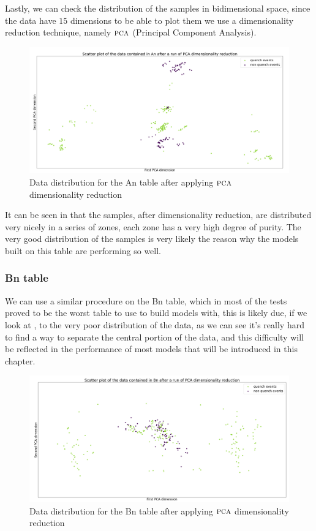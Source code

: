 Lastly, we can check the distribution of the samples in bidimensional space, since the data have
$15$ dimensions to be able to plot them we use a dimensionality reduction technique, namely
$\textsc{pca}$ (Principal Component Analysis).
\begin{figure}[h!]
	\centering
	\includegraphics[scale=.2]{img/An_distribution.png}
	\caption{Data distribution for the An table after applying $\textsc{pca}$ dimensionality
		reduction} \label{fig:an-dist}
\end{figure}

It can be seen in  that the samples, after dimensionality reduction, are distributed very nicely in a series
of zones, each zone has a very high degree of purity. The very good distribution of the samples is
very likely the reason why the models built on this table are performing so well.

\subsubsection{Bn table}
We can use a similar procedure on the Bn table, which in most of the tests proved to be the worst
table to use to build models with, this is likely due, if we look at , to the very
poor distribution of the data, as we can see it's really hard to find a way to separate the central
portion of the data, and this difficulty will be reflected in the performance of most models that
will be introduced in this chapter.
\begin{figure}[h!]
	\centering
	\includegraphics[scale=.2]{img/Bn_distribution.png}
	\caption{Data distribution for the Bn table after applying $\textsc{pca}$ dimensionality
		reduction} \label{fig:bn-dist}
\end{figure}

